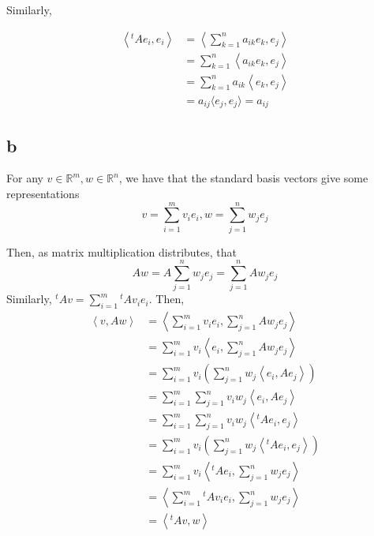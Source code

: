 \documentclass[12pt,letterpaper]{article}
\theoremstyle{definition}
\newcommand{\R}{\mathbb{R}}
\begin{document}
Similarly,

\begin{align*}
  \left\langle {^tAe_i}, e_i \right\rangle &= \left\langle \sum_{k=1}^n a_{ik}e_k, e_j \right\rangle \\
                            &= \sum_{k=1}^n \left\langle  a_{ik}e_k,e_j \right\rangle \\
                            &= \sum_{k=1}^n a_{ik} \left\langle e_k, e_j \right\rangle \\
                            &= a_{ij}\langle e_j, e_j \rangle = a_{ij}
\end{align*}

\subsection*{b}

For any $v \in \R^m, w \in \R^n$, we have that the standard basis vectors give
some representations
\[
  v = \sum_{i=1}^m v_ie_i, w = \sum_{j=1}^n w_je_j
\]

Then, as matrix multiplication distributes, that
\[
  Aw = A\sum_{j=1}^n w_je_j = \sum_{j=1}^n Aw_je_j
\]
Similarly, $^tAv = \sum_{i=1}^m {^tA}v_ie_i$. Then,
\begin{align*}
  \left\langle v, Aw \right\rangle &= \left\langle \sum_{i=1}^mv_ie_i, \sum_{j=1}^nAw_je_j
  \right\rangle \\
                        &= \sum_{i=1}^m v_i\left\langle e_i, \sum_{j=1}^n Aw_je_j
                        \right\rangle \\
                        &= \sum_{i=1}^mv_i\left(\sum_{j=1}^n w_j \left\langle e_i, Ae_j\right\rangle
                        \right) \\
                        &= \sum_{i=1}^m \sum_{j=1}^n v_iw_j \left\langle e_i, Ae_j
                        \right\rangle \\
                        &= \sum_{i=1}^m \sum_{j=1}^n v_iw_j \left\langle {^tA}e_i, e_j
                        \right\rangle \\
                        &= \sum_{i=1}^m v_i \left( \sum_{j=1}^n w_j\left\langle
                        {^tA}e_i, e_j \right\rangle \right) \\
                        &= \sum_{i=1}^m v_i \left\langle
                        {^tA}e_i, \sum_{j=1}^n w_je_j \right\rangle \\
                        &= \left\langle \sum_{i=1}^m {^tA}v_ie_i, \sum_{j=1}^nw_je_j
                        \right\rangle \\
                        &= \left\langle {^tA}v, w \right\rangle
\end{align*}
\end{document}

